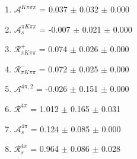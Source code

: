 \begin{enumerate}
\item $\mathcal{A}^{K\pi\pi\pi}$ = 0.037 $\pm$ 0.032 $\pm$ 0.000
\item $\mathcal{A}_s^{\pi K\pi\pi}$ = -0.007 $\pm$ 0.021 $\pm$ 0.000
\item $\mathcal{R}_{\pi K\pi\pi}^+$ = 0.074 $\pm$ 0.026 $\pm$ 0.000
\item $\mathcal{R}_{\pi K\pi\pi}^-$ = 0.072 $\pm$ 0.025 $\pm$ 0.000
\item $\mathcal{A}^{4\pi,2}$ = -0.026 $\pm$ 0.151 $\pm$ 0.000
\item $\mathcal{R}^{4\pi}$ = 1.012 $\pm$ 0.165 $\pm$ 0.031
\item $\mathcal{A}_s^{4\pi}$ = 0.124 $\pm$ 0.085 $\pm$ 0.000
\item $\mathcal{R}_{s}^{4\pi}$ = 0.964 $\pm$ 0.086 $\pm$ 0.028
\end{enumerate}
